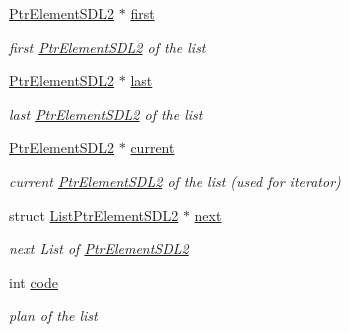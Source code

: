 \begin{DoxyCompactItemize}
\item 
\hyperlink{structPtrElementSDL2}{Ptr\+Element\+S\+D\+L2} $\ast$ \hyperlink{structListPtrElementSDL2_ac6e082dab2ed9516795b21b841a7808f}{first}\hypertarget{structListPtrElementSDL2_ac6e082dab2ed9516795b21b841a7808f}{}\label{structListPtrElementSDL2_ac6e082dab2ed9516795b21b841a7808f}

\begin{DoxyCompactList}\small\item\em first \hyperlink{structPtrElementSDL2}{Ptr\+Element\+S\+D\+L2} of the list \end{DoxyCompactList}\item 
\hyperlink{structPtrElementSDL2}{Ptr\+Element\+S\+D\+L2} $\ast$ \hyperlink{structListPtrElementSDL2_a75a0428e9ce2b7ac513817bb7eb14166}{last}\hypertarget{structListPtrElementSDL2_a75a0428e9ce2b7ac513817bb7eb14166}{}\label{structListPtrElementSDL2_a75a0428e9ce2b7ac513817bb7eb14166}

\begin{DoxyCompactList}\small\item\em last \hyperlink{structPtrElementSDL2}{Ptr\+Element\+S\+D\+L2} of the list \end{DoxyCompactList}\item 
\hyperlink{structPtrElementSDL2}{Ptr\+Element\+S\+D\+L2} $\ast$ \hyperlink{structListPtrElementSDL2_aed8b7b9ca4455c05f016dd8089925ba6}{current}\hypertarget{structListPtrElementSDL2_aed8b7b9ca4455c05f016dd8089925ba6}{}\label{structListPtrElementSDL2_aed8b7b9ca4455c05f016dd8089925ba6}

\begin{DoxyCompactList}\small\item\em current \hyperlink{structPtrElementSDL2}{Ptr\+Element\+S\+D\+L2} of the list (used for iterator) \end{DoxyCompactList}\item 
struct \hyperlink{structListPtrElementSDL2}{List\+Ptr\+Element\+S\+D\+L2} $\ast$ \hyperlink{structListPtrElementSDL2_a43cb2411041a437b88b3bf31c7200756}{next}\hypertarget{structListPtrElementSDL2_a43cb2411041a437b88b3bf31c7200756}{}\label{structListPtrElementSDL2_a43cb2411041a437b88b3bf31c7200756}

\begin{DoxyCompactList}\small\item\em next List of \hyperlink{structPtrElementSDL2}{Ptr\+Element\+S\+D\+L2} \end{DoxyCompactList}\item 
int \hyperlink{structListPtrElementSDL2_aaaf9f2fe9741abeb45133989b00fec00}{code}\hypertarget{structListPtrElementSDL2_aaaf9f2fe9741abeb45133989b00fec00}{}\label{structListPtrElementSDL2_aaaf9f2fe9741abeb45133989b00fec00}

\begin{DoxyCompactList}\small\item\em plan of the list \end{DoxyCompactList}\end{DoxyCompactItemize}



